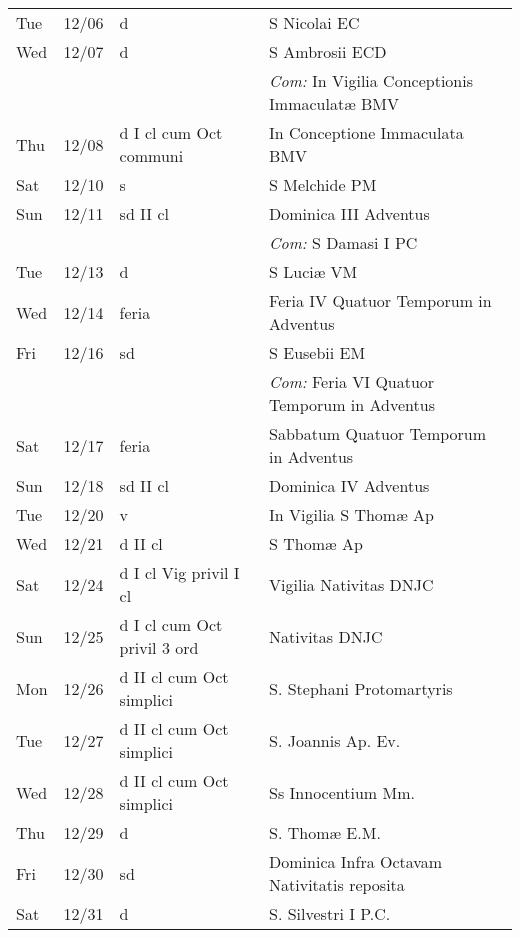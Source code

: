\documentclass[10pt]{article}
\begin{document}
\begin{longtable}{ l l l l }
Tue & 12/06 & d & S Nicolai EC\\
Wed & 12/07 & d & S Ambrosii ECD\\
 & & & \textit{Com:} In Vigilia Conceptionis Immaculatæ BMV\\
Thu & 12/08 & d I cl cum Oct communi & In Conceptione Immaculata BMV\\
Sat & 12/10 & s & S Melchide PM\\
Sun & 12/11 & sd II cl & Dominica III Adventus\\
 & & & \textit{Com:} S Damasi I PC\\
Tue & 12/13 & d & S Luciæ VM\\
Wed & 12/14 & feria & Feria IV Quatuor Temporum in Adventus\\
Fri & 12/16 & sd & S Eusebii EM\\
 & & & \textit{Com:} Feria VI Quatuor Temporum in Adventus\\
Sat & 12/17 & feria & Sabbatum Quatuor Temporum in Adventus\\
Sun & 12/18 & sd II cl & Dominica IV Adventus\\
Tue & 12/20 & v & In Vigilia S Thomæ Ap\\
Wed & 12/21 & d II cl & S Thomæ Ap\\
Sat & 12/24 & d I cl Vig privil I cl & Vigilia Nativitas DNJC\\
Sun & 12/25 & d I cl cum Oct privil 3 ord & Nativitas DNJC\\
Mon & 12/26 & d II cl cum Oct simplici & S. Stephani Protomartyris\\
Tue & 12/27 & d II cl cum Oct simplici & S. Joannis Ap. Ev.\\
Wed & 12/28 & d II cl cum Oct simplici & Ss Innocentium Mm.\\
Thu & 12/29 & d & S. Thomæ E.M.\\
Fri & 12/30 & sd & Dominica Infra Octavam Nativitatis reposita\\
Sat & 12/31 & d & S. Silvestri I P.C.\\
\end{longtable}
\end{document}
